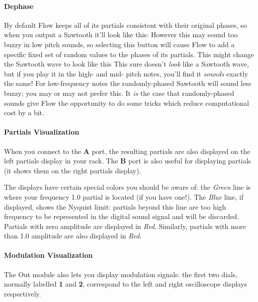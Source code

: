 \documentclass{article}
\begin{document}
\paragraph{Dephase} By default Flow keeps all of its partials consistent with their original phases, so when you output a Sawtooth it'll look like this:  \quad However this may sound too buzzy in low pitch sounds, so selecting this button will cause Flow to add a specific fixed set of random values to the phases of its partials.  This might change the Sawtooth wave to look like this \quad This sure doesn't {\it look} like a Sawtooth wave, but if you play it in the high- and mid- pitch notes, you'll find it {\it sounds} exactly the same!  For low-frequency notes the randomly-phased Sawtooth will sound less buzzy; you may or may not prefer this.  It {\it is} the case that randomly-phased sounds give Flow the opportunity to do some tricks which reduce computational cost by a bit.

\paragraph{Partials Visualization}  When you connect to the {\bf A} port, the resulting partials are also displayed on the left partials display in your rack.  The {\bf B} port is also useful for displaying partials (it shows them on the right partials display).  

The displays have certain special colors you should be aware of: the {\it Green} line is where your frequency 1.0 partial is located (if you have one!).  The {\it Blue} line, if displayed, shows the Nyquist limit: partials beyond this line are too high frequency to be represented in the digital sound signal and will be discarded.  Partials with zero amplitude are displayed in {\it Red}.  Similarly, partials with more than 1.0 amplitude are also displayed in {\it Red}.

\paragraph{Modulation Visualization} The Out module also lets you display modulation signals: the first two dials, normally labelled {\bf 1} and {\bf 2}, correspond to the left and right oscilloscope displays respectively.
\end{document}
